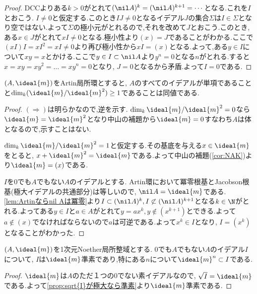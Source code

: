 \begin{proof}
	DCCよりある$k>0$がとれて$(\nil A)^k=(\nil A)^{k+1}=\cdots$となる.これを$I$とおこう. $I\neq0$と仮定する.このとき$IJ\neq0$となるイデアル$J$の集合$\Sigma$は$I\in\Sigma$となり空ではない.よって$\Sigma$の極小元がとれるので,それを改めて$J$とおこう.このとき,ある$x\in J$がとれて$xI\neq0$となる.極小性より$(x)=J$であることがわかる.ここで$(xI)I=xI^2=xI\neq0$より再び極小性から$xI=(x)$となる.よって,ある$y\in I$について$xy=x$とかける.ここで$y\in I\subset\nil A$より$y^n=0$となる$n$がとれる.すると$x=xy=xy^2=\dots=xy^n=0$となり, $J=0$となるから矛盾.よって$I=0$である.
\end{proof}

\begin{prop}\label{lem:DVR-B}
	$(A,\ideal{m})$をArtin局所環とすると, $A$のすべてのイデアルが単項であることと$\dim_k(\ideal{m}/\ideal{m}^2)\geq1$であることは同値である.
\end{prop}

\begin{proof}
	$(\Longrightarrow)$は明らかなので,逆を示す. $\dim_k \ideal{m}/\ideal{m}^2=0$なら$\ideal{m}=\ideal{m}^2$となり中山の補題から$\ideal{m}=0$すなわち$A$は体となるので,示すことはない.
	
	$\dim_k \ideal{m}/\ideal{m}^2=1$と仮定する.その基底を与える$x\in\ideal{m}$をとると, $x+\ideal{m}^2=\ideal{m}$である.よって中山の補題(\ref{cor:NAK})より$\ideal{m}=(x)$である.
	
	$I$を$0$でも$A$でもない$A$のイデアルとする. Artin環において冪零根基とJacobson根基(極大イデアルの共通部分)は等しいので, $\nil A=\ideal{m}$である. \ref{lem:Artinならnil Aは冪零}より$I\subset(\nil A)^k,I\not\subset(\nil A)^{k+1}$となる$k\in\N$がとれる.よってある$y\in I$と$a\in A$がとれて$y=ax^k,y\not\in(x^{k+1})$とできる.よって$a\not\in(x)$でなければならないので$a$は可逆である.よって$x^k\in I$となり, $I=(x^k)$となることがわかった.
\end{proof}

\begin{lem}\label{lem:DVR-C}
	$(A,\ideal{m})$を1次元Noether局所整域とする. $0$でも$A$でもない$A$のイデアル$I$について, $I$は$\ideal{m}$準素であり,特にある$n$について$\ideal{m}^n\subset I$である.
\end{lem}

\begin{proof}
	$\ideal{m}$は$A$のただ１つの0でない素イデアルなので, $\sqrt{I}=\ideal{m}$である.よって\ref{prop:sqrt{I}が極大なら準素}より$\ideal{m}$準素である.
\end{proof}


